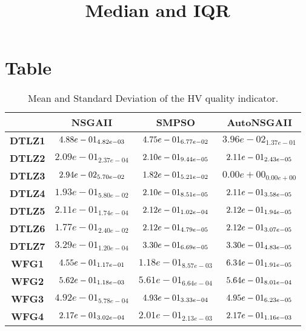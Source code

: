 \documentclass{article}
\title{Median and IQR}
\author{}
\begin{document}
\maketitle
\section{Table}
\begin{table}[!htp]
  \caption{Mean and Standard Deviation of the HV quality indicator.}
  \label{table:HV}
  \centering
  \begin{scriptsize}
  \begin{tabular}{c|ccc}
      & \textbf{NSGAII} & \textbf{SMPSO} & \textbf{AutoNSGAII} \\\hline
      \textbf{DTLZ1} & $\cellcolor{gray95} 4.88e-01_{4.82e-03} $ & $ \cellcolor{gray25} 4.75e-01_{6.77e-02} $ & $ 3.96e-02_{1.37e-01}$ \\
      \textbf{DTLZ2} & $2.09e-01_{2.37e-04} $ & $ \cellcolor{gray25} 2.10e-01_{9.44e-05} $ & $ \cellcolor{gray95} 2.11e-01_{2.43e-05}$ \\
      \textbf{DTLZ3} & $\cellcolor{gray25} 2.94e-02_{5.70e-02} $ & $ \cellcolor{gray95} 1.82e-01_{5.21e-02} $ & $ 0.00e+00_{0.00e+00}$ \\
      \textbf{DTLZ4} & $1.93e-01_{5.80e-02} $ & $ \cellcolor{gray25} 2.10e-01_{8.51e-05} $ & $ \cellcolor{gray95} 2.11e-01_{3.58e-05}$ \\
      \textbf{DTLZ5} & $2.11e-01_{1.74e-04} $ & $ \cellcolor{gray25} 2.12e-01_{1.02e-04} $ & $ \cellcolor{gray95} 2.12e-01_{1.94e-05}$ \\
      \textbf{DTLZ6} & $1.77e-01_{2.40e-02} $ & $ \cellcolor{gray25} 2.12e-01_{4.79e-05} $ & $ \cellcolor{gray95} 2.12e-01_{3.07e-05}$ \\
      \textbf{DTLZ7} & $3.29e-01_{1.20e-04} $ & $ \cellcolor{gray25} 3.30e-01_{6.69e-05} $ & $ \cellcolor{gray95} 3.30e-01_{4.83e-05}$ \\
      \textbf{WFG1} & $\cellcolor{gray25} 4.55e-01_{1.17e-01} $ & $ 1.18e-01_{8.57e-03} $ & $ \cellcolor{gray95} 6.34e-01_{1.91e-05}$ \\
      \textbf{WFG2} & $\cellcolor{gray25} 5.62e-01_{1.18e-03} $ & $ 5.61e-01_{6.64e-04} $ & $ \cellcolor{gray95} 5.64e-01_{8.01e-04}$ \\
      \textbf{WFG3} & $4.92e-01_{5.78e-04} $ & $ \cellcolor{gray25} 4.93e-01_{3.33e-04} $ & $ \cellcolor{gray95} 4.95e-01_{6.23e-05}$ \\
      \textbf{WFG4} & $\cellcolor{gray95} 2.17e-01_{3.02e-04} $ & $ 2.01e-01_{2.13e-03} $ & $ \cellcolor{gray25} 2.17e-01_{1.16e-03}$ \\

\end{tabular}
\end{scriptsize}
\end{table}
\end{document}
